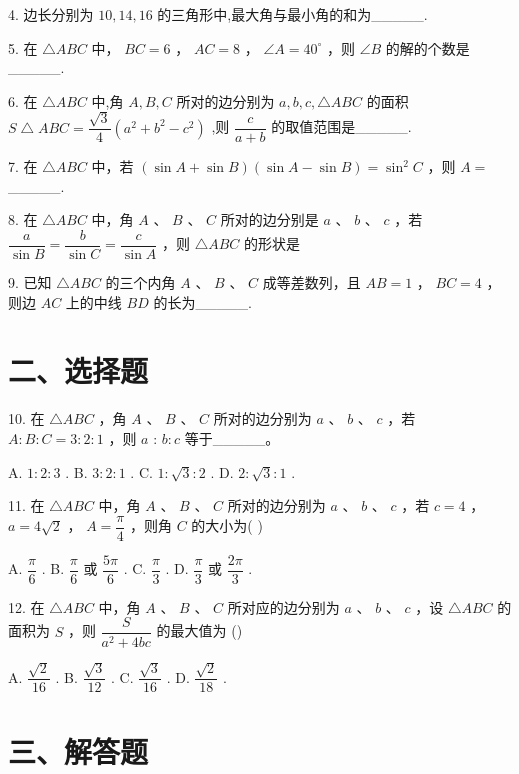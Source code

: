 4. 边长分别为 ${10},{14},{16}$ 的三角形中,最大角与最小角的和为\_\_\_\_\_.

5. 在 $\bigtriangleup  {ABC}$ 中， ${BC} = 6$ ， ${AC} = 8$ ， $\angle A = {40}^{ \circ  }$ ，则 $\angle B$ 的解的个数是\_\_\_\_\_.

6. 在 $\bigtriangleup {ABC}$ 中,角 $A,B,C$ 所对的边分别为 $a,b,c,\bigtriangleup {ABC}$ 的面积 $S\bigtriangleup {ABC} = \dfrac{\sqrt{3}}{4}\left( {{a}^{2} + {b}^{2} - {c}^{2}}\right)$ ,则 $\dfrac{c}{a + b}$ 的取值范围是\_\_\_\_\_.

7. 在 $\bigtriangleup  {ABC}$ 中，若 $\left( {\sin A + \sin B}\right) \left( {\sin A - \sin B}\right)  = {\sin }^{2}C$ ，则 $A =$ \_\_\_\_\_.

8. 在 $\bigtriangleup  {ABC}$ 中，角 $A$ 、 $B$ 、 $C$ 所对的边分别是 $a$ 、 $b$ 、 $c$ ，若 $\dfrac{a}{\sin B} = \dfrac{b}{\sin C} = \dfrac{c}{\sin A}$ ，则 $\bigtriangleup  {ABC}$ 的形状是

9. 已知 $\bigtriangleup {ABC}$ 的三个内角 $A$ 、 $B$ 、 $C$ 成等差数列，且 ${AB} = 1$ ， ${BC} = 4$ ，则边 ${AC}$ 上的中线 ${BD}$ 的长为\_\_\_\_\_.

\section*{二、选择题}

10. 在 $\bigtriangleup  {ABC}$ ，角 $A$ 、 $B$ 、 $C$ 所对的边分别为 $a$ 、 $b$ 、 $c$ ，若 $A : B : C = 3 : 2 : 1$ ，则 $a$ : $b : c$ 等于\_\_\_\_\_。

A. $1 : 2 : 3$ . B. $3 : 2 : 1$ . C. $1 : \sqrt{3} : 2$ . D. $2 : \sqrt{3} : 1$ .

11. 在 $\bigtriangleup  {ABC}$ 中，角 $A$ 、 $B$ 、 $C$ 所对的边分别为 $a$ 、 $b$ 、 $c$ ，若 $c = 4$ ， $a = 4\sqrt{2}$ ， $A = \dfrac{\pi }{4}$ ，则角 $C$ 的大小为( )

A. $\dfrac{\pi }{6}$ . B. $\dfrac{\pi }{6}$ 或 $\dfrac{5\pi }{6}$ . C. $\dfrac{\pi }{3}$ . D. $\dfrac{\pi }{3}$ 或 $\dfrac{2\pi }{3}$ .

12. 在 $\bigtriangleup  {ABC}$ 中，角 $A$ 、 $B$ 、 $C$ 所对应的边分别为 $a$ 、 $b$ 、 $c$ ，设 $\bigtriangleup  {ABC}$ 的面积为 $S$ ，则 $\dfrac{S}{{a}^{2} + {4bc}}$ 的最大值为 ()

A. $\dfrac{\sqrt{2}}{16}$ . B. $\dfrac{\sqrt{3}}{12}$ . C. $\dfrac{\sqrt{3}}{16}$ . D. $\dfrac{\sqrt{2}}{18}$ .

\section*{三、解答题}

